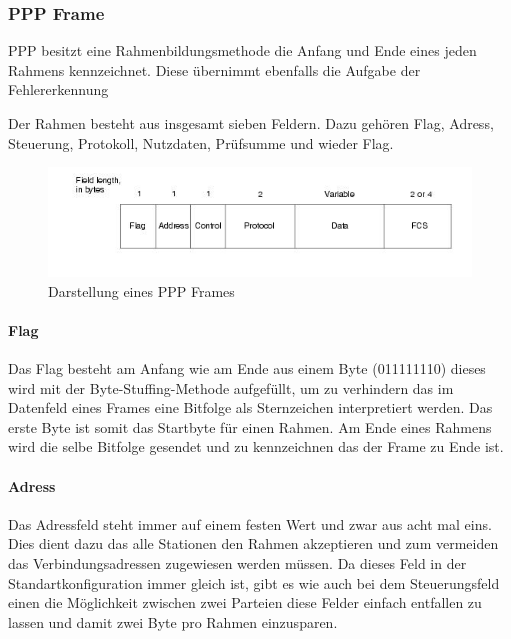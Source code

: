 \documentclass[12pt, a4paper, ngerman]{article}
\begin{document}
\subsubsection{PPP Frame}

PPP besitzt eine Rahmenbildungsmethode die Anfang und Ende eines jeden Rahmens kennzeichnet. Diese übernimmt ebenfalls die Aufgabe der Fehlererkennung

Der Rahmen besteht aus insgesamt sieben Feldern. Dazu gehören Flag, Adress, Steuerung,  Protokoll, Nutzdaten, Prüfsumme und wieder Flag.

\begin{figure}[H]
	\centering
	\includegraphics[width=1\textwidth]{Grafiken/ppp-frame.jpg}	
	\caption{Darstellung eines PPP Frames \cite{*}}
	\label{ppp_frame}
\end{figure}

\paragraph{Flag}

Das Flag besteht am Anfang wie am Ende aus einem Byte (011111110) dieses wird mit der Byte-Stuffing-Methode aufgefüllt, um zu verhindern das im Datenfeld eines Frames eine Bitfolge als Sternzeichen interpretiert werden. Das erste Byte ist somit das Startbyte für einen Rahmen. Am Ende eines Rahmens wird die selbe Bitfolge gesendet und zu kennzeichnen das der Frame zu Ende ist.


\paragraph{Adress}

Das Adressfeld steht immer auf einem festen Wert und zwar aus acht mal eins. Dies dient dazu das alle Stationen den Rahmen akzeptieren und zum vermeiden das Verbindungsadressen zugewiesen werden müssen. Da dieses Feld in der Standartkonfiguration immer gleich ist, gibt es wie auch bei dem Steuerungsfeld einen die Möglichkeit zwischen zwei Parteien diese Felder einfach entfallen zu lassen und damit zwei Byte pro Rahmen einzusparen.
\end{document}
